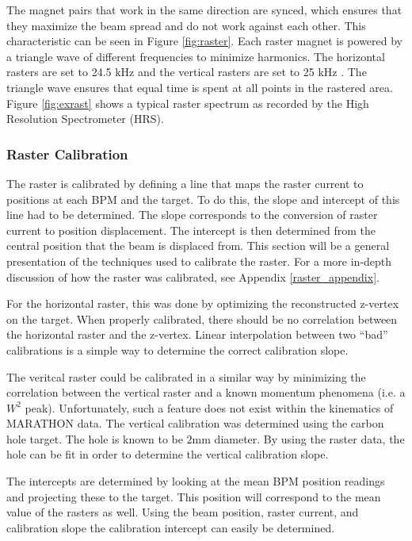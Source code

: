 The magnet pairs that work in the same direction are synced, which ensures that they maximize the beam spread and do not work against each other. This characteristic can be seen in Figure \ref{fig:raster}. Each raster magnet is powered by a triangle wave of different frequencies to minimize harmonics. The horizontal rasters are set to 24.5 kHz and the vertical rasters are set to 25 kHz \cite{rast_current}. The triangle wave ensures that equal time is spent at all points in the rastered area. Figure \ref{fig:exrast} shows a typical raster spectrum as recorded by the High Resolution Spectrometer (HRS).

\subsubsection{Raster Calibration}

The raster is calibrated by defining a line that maps the raster current to positions at each BPM and the target. To do this, the slope and intercept of this line had to be determined. The slope corresponds to the conversion of raster current to position displacement. The intercept is then determined from the central position that the beam is displaced from. This section will be a general presentation of the techniques used to calibrate the raster. For a more in-depth discussion of how the raster was calibrated, see Appendix \ref{raster_appendix}.

For the horizontal raster, this was done by optimizing the reconstructed z-vertex on the target. When properly calibrated, there should be no correlation between the horizontal raster and the z-vertex. Linear interpolation between two ``bad'' calibrations is a simple way to determine the correct calibration slope.

The veritcal raster could be calibrated in a similar way by minimizing the correlation between the vertical raster and a known momentum phenomena (i.e. a $W^2$ peak). Unfortunately, such a feature does not exist within the kinematics of MARATHON data. The vertical calibration was determined using the carbon hole target. The hole is known to be $2$mm diameter. By using the raster data, the hole can be fit in order to determine the vertical calibration slope.

The intercepts are determined by looking at the mean BPM position readings and projecting these to the target. This position will correspond to the mean value of the rasters as well. Using the beam position, raster current, and calibration slope the calibration intercept can easily be determined.

